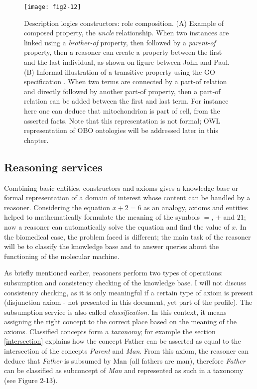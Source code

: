 \begin{figure}[ht]
    \centering
    \texttt{[image: fig2-12]}
    \caption{Description logics constructors: role composition. (A) Example of composed property, the \emph{uncle} relationship. When two instances are linked using a \emph{brother-of} property, then followed by a \emph{parent-of} property, then a reasoner can create a property between the first and the last individual, as shown on figure between John and Paul. (B) Informal illustration of a transitive property using the GO specification \citep{gorels}. When two terms are connected by a part-of relation and directly followed by another part-of property, then a part-of relation can be added between the first and last term. For instance here one can deduce that mitochondrion is part of cell, from the asserted facts. Note that this representation is not formal; OWL representation of OBO ontologies will be addressed later in this chapter.}
    \label{fig2-12}
\end{figure}

\subsection{Reasoning services}

Combining basic entities, constructors and axioms gives a knowledge base or formal representation of a domain of interest whose content can be handled by a reasoner. Considering the equation $ x + 2 = 6 $ as an analogy, axioms and entities helped to mathematically formulate the meaning of the symbols $ = $, $ + $ and $ 21 $; now a reasoner can automatically solve the equation and find the value of $ x $. In the biomedical case, the problem faced is different; the main task of the reasoner will be to classify the knowledge base and to answer queries about the functioning of the molecular machine.

As briefly mentioned earlier, reasoners perform two types of operations: subsumption and consistency checking of the knowledge base. I will not discuss consistency checking, as it is only meaningful if a certain type of axiom is present (disjunction axiom - not presented in this document, yet part of the  profile). The subsumption service is also called \emph{classification}. In this context, it means assigning the right concept to the correct place based on the meaning of the axioms. Classified concepts form a \emph{taxonomy}; for example the section \ref{intersection} explains how the concept Father can be asserted as equal to the intersection of the concepts \emph{Parent} and \emph{Man}. From this axiom, the reasoner can deduce that \emph{Father} is subsumed by Man (all fathers are man), therefore \emph{Father} can be classified as subconcept of \emph{Man} and represented as such in a taxonomy (see Figure 2-13).


